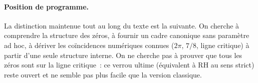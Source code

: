 \paragraph{Position de programme.}
La distinction maintenue tout au long du texte est la suivante. On
cherche à comprendre la structure des zéros, à fournir un cadre canonique
sans paramètre ad hoc, à dériver les coïncidences numériques connues
($2\pi$, $7/8$, ligne critique) à partir d'une seule structure interne.
On ne cherche pas à prouver que tous les zéros sont sur la ligne
critique~: ce verrou ultime (équivalent à RH au sens strict) reste ouvert
et ne semble pas plus facile que la version classique.

